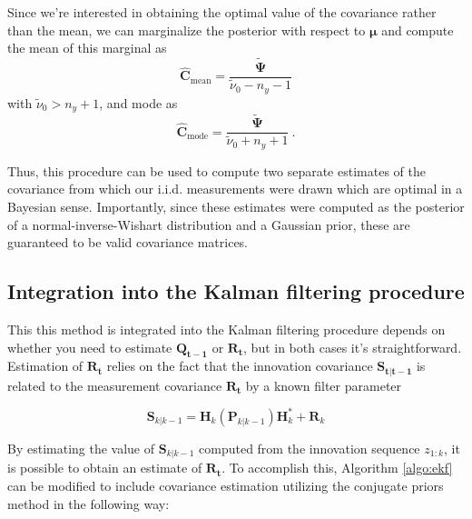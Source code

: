 \documentclass[11pt]{article}
\newcounter{algo}
\begin{document}
\noindent Since we're interested in obtaining the optimal value of the covariance rather than the mean, we can marginalize the posterior with respect to $\mathbf{\mu}$ and compute the mean of this marginal as
\begin{equation}\label{eq:Cmean}
	\hat{\mathbf{C}}_{\textrm{mean}} = \frac{\tilde{\bm{\Psi}}}{\tilde{\nu}_0 - n_y - 1}
\end{equation}
\noindent with $\tilde{\nu}_0 > n_y + 1$, and mode as
\begin{equation}\label{eq:Cmode}
	\hat{\mathbf{C}}_{\textrm{mode}} = \frac{\tilde{\bm{\Psi}}}{\tilde{\nu}_0 + n_y + 1} ~.
\end{equation} 

\noindent Thus, this procedure can be used to compute two separate estimates of the covariance from which our i.i.d. measurements were drawn which are optimal in a Bayesian sense. Importantly, since these estimates were computed as the posterior of a normal-inverse-Wishart distribution and a Gaussian prior, these are guaranteed to be valid covariance matrices.

\subsection{Integration into the Kalman filtering procedure}

This this method is integrated into the Kalman filtering procedure depends on whether you need to estimate $\mathbf{Q_{t-1}}$ or $\mathbf{R_{t}}$, but in both cases it's straightforward. Estimation of $\mathbf{R_{t}}$ relies on the fact that the innovation covariance $\mathbf{S_{t|t-1}}$ is related to the measurement covariance $\mathbf{R_{t}}$ by a known filter parameter

\begin{equation}\label{eq:Cinnov}
\mathbf{S}_{k|k-1} = \mathbf{H}_{k}(\mathbf{P}_{k|k-1})\mathbf{H}_{k}^* + \mathbf{R}_{k}
\end{equation}

\noindent By estimating the value of $\mathbf{S}_{k|k-1}$ computed from the innovation sequence $z_{1:k}$, it is possible to obtain an estimate of $\mathbf{R_{t}}$. To accomplish this, Algorithm \ref{algo:ekf} can be modified to include covariance estimation utilizing the conjugate priors method in the following way:
\end{document}
